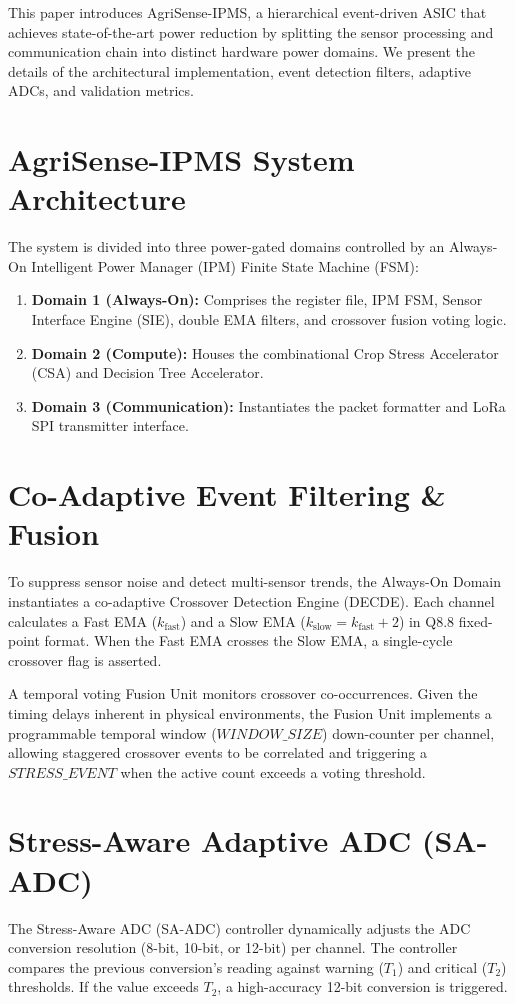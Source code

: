 \documentclass[conference]{IEEEtran}
\begin{document}
This paper introduces AgriSense-IPMS, a hierarchical event-driven ASIC that achieves state-of-the-art power reduction by splitting the sensor processing and communication chain into distinct hardware power domains. We present the details of the architectural implementation, event detection filters, adaptive ADCs, and validation metrics.

\section{AgriSense-IPMS System Architecture}
The system is divided into three power-gated domains controlled by an Always-On Intelligent Power Manager (IPM) Finite State Machine (FSM):
\begin{enumerate}
    \item \textbf{Domain 1 (Always-On):} Comprises the register file, IPM FSM, Sensor Interface Engine (SIE), double EMA filters, and crossover fusion voting logic.
    \item \textbf{Domain 2 (Compute):} Houses the combinational Crop Stress Accelerator (CSA) and Decision Tree Accelerator.
    \item \textbf{Domain 3 (Communication):} Instantiates the packet formatter and LoRa SPI transmitter interface.
\end{enumerate}

\section{Co-Adaptive Event Filtering \& Fusion}
To suppress sensor noise and detect multi-sensor trends, the Always-On Domain instantiates a co-adaptive Crossover Detection Engine (DECDE). Each channel calculates a Fast EMA ($k_{\text{fast}}$) and a Slow EMA ($k_{\text{slow}} = k_{\text{fast}} + 2$) in Q8.8 fixed-point format. When the Fast EMA crosses the Slow EMA, a single-cycle crossover flag is asserted. 

A temporal voting Fusion Unit monitors crossover co-occurrences. Given the timing delays inherent in physical environments, the Fusion Unit implements a programmable temporal window ($WINDOW\_SIZE$) down-counter per channel, allowing staggered crossover events to be correlated and triggering a $STRESS\_EVENT$ when the active count exceeds a voting threshold.

\section{Stress-Aware Adaptive ADC (SA-ADC)}
The Stress-Aware ADC (SA-ADC) controller dynamically adjusts the ADC conversion resolution (8-bit, 10-bit, or 12-bit) per channel. The controller compares the previous conversion's reading against warning ($T_1$) and critical ($T_2$) thresholds. If the value exceeds $T_2$, a high-accuracy 12-bit conversion is triggered. 
\end{document}

